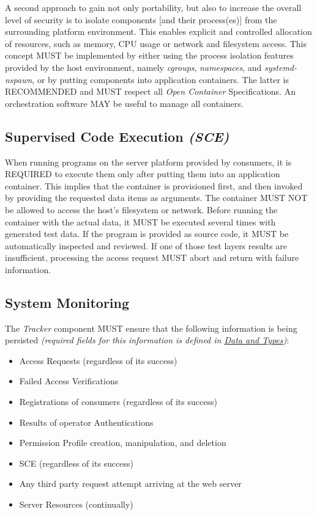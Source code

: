 \documentclass[12pt,english,a4paper,titlepage,cleardoublepage=empty,dottedtoc]{report}
\providecommand{\tightlist}{%
  \setlength{\itemsep}{0pt}\setlength{\parskip}{0pt}}
\begin{document}
A second approach to gain not only portability, but also to increase the
overall level of security is to isolate components {[}and their
process(es){]} from the surrounding platform environment. This enables
explicit and controlled allocation of resources, such as memory, CPU
usage or network and filesystem access. This concept MUST be implemented
by either using the process isolation features provided by the host
environment, namely \emph{cgroups}, \emph{namespaces}, and
\emph{systemd-nspawn}, or by putting components into application
containers. The latter is RECOMMENDED and MUST respect all \emph{Open
Container} Specifications. An orchestration software MAY be useful to
manage all containers.

\subsection{\texorpdfstring{Supervised Code Execution
\emph{(SCE)}}{Supervised Code Execution (SCE)}}\label{supervised-code-execution-sce}

When running programs on the server platform provided by consumers, it
is REQUIRED to execute them only after putting them into an application
container. This implies that the container is provisioned first, and
then invoked by providing the requested data items as arguments. The
container MUST NOT be allowed to access the host's filesystem or
network. Before running the container with the actual data, it MUST be
executed several times with generated test data. If the program is
provided as source code, it MUST be automatically inspected and
reviewed. If one of those test layers results are insufficient,
processing the access request MUST abort and return with failure
information.

\subsection{System Monitoring}\label{system-monitoring}

The \emph{Tracker} component MUST ensure that the following information
is being persisted \emph{(required fields for this information is
defined in \protect\hyperlink{data-and-types}{Data and Types})}:

\begin{itemize}
\tightlist
\item
  Access Requests (regardless of its success)
\item
  Failed Access Verifications
\item
  Registrations of consumers (regardless of its success)
\item
  Results of operator Authentications
\item
  Permission Profile creation, manipulation, and deletion
\item
  SCE (regardless of its success)
\item
  Any third party request attempt arriving at the web server
\item
  Server Resources (continually)
\end{itemize}
\end{document}
